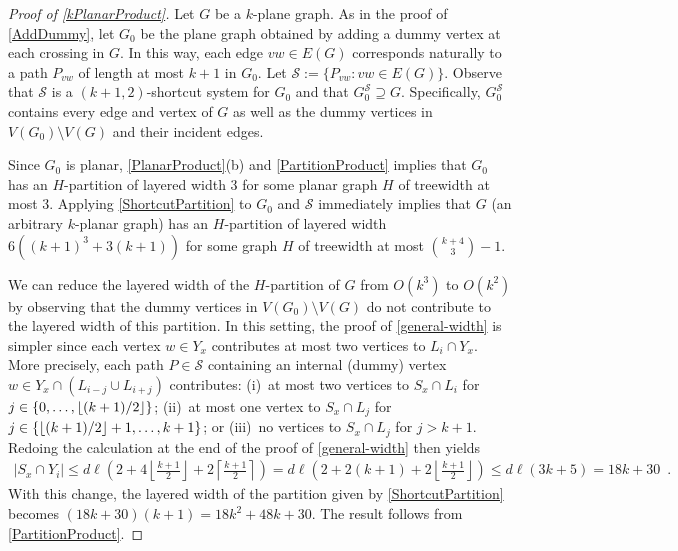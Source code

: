 \documentclass{patmorin}
\theoremstyle{plain}
\newtheorem{thm}{Theorem}
\theoremstyle{definition}
\DeclareMathOperator{\tw}{tw}
\DeclarePairedDelimiter{\floor}{\lfloor}{\rfloor}
\renewcommand{\SS}{\mathcal{S}}
\renewcommand{\le}{\leqslant}
\renewcommand{\leq}{\leqslant}
\newcommand{\R}{\mathbb{R}}
\begin{document}

\begin{proof}[Proof of \cref{kPlanarProduct}]
	Let $G$ be a $k$-plane graph.
	As in the proof of \cref{AddDummy}, let $G_0$ be the plane graph obtained by adding a dummy vertex at each crossing in $G$. In this way, each edge $vw\in E(G)$ corresponds naturally to a path $P_{vw}$ of length at most $k+1$ in $G_0$.  Let $\SS := \{P_{vw}: vw\in E(G)\}$. Observe that $\SS$ is a $(k+1,2)$-shortcut system for $G_0$ and that $G_0^{\SS}\supseteq G$.  Specifically, $G_0^{\SS}$ contains every edge and vertex of $G$ as well as the dummy vertices in $V(G_0)\setminus V(G)$ and their incident edges.

	Since $G_0$ is planar,  \cref{PlanarProduct}(b) and \cref{PartitionProduct} implies that $G_0$ has an $H$-partition of layered width 3 for some planar graph $H$ of treewidth at most 3.  Applying \cref{ShortcutPartition} to $G_0$ and $\SS$ immediately implies that $G$ (an arbitrary $k$-planar graph) has an $H$-partition of layered width $6((k+1)^3+3(k+1))$ for some graph $H$ of treewidth at most $\binom{k+4}{3}-1$.

	We can reduce the layered width of the $H$-partition of $G$ from $O(k^3)$ to $O(k^2)$ by observing that the dummy vertices in $V(G_0)\setminus V(G)$ do not contribute to the layered width of this partition.  In this setting, the proof of \cref{general-width} is simpler since each vertex $w\in Y_x$ contributes at most two vertices to $L_i\cap Y_x$.  More precisely, each path $P\in\SS$ containing an internal (dummy) vertex $w\in Y_x\cap (L_{i-j}\cup L_{i+j})$ contributes: (i)~at most two vertices to $S_x\cap L_i$ for $j\in\{0,\ldots,\floor{(k+1)/2}\}$; (ii)~at most one vertex to $S_x\cap L_j$ for $j\in\{\floor{(k+1)/2}+1,\ldots,k+1\}$; or (iii)~no vertices to $S_x\cap L_j$ for $j > k+1$.
	Redoing the calculation at the end of the proof of \cref{general-width} then yields
	\begin{align*}
	|S_x\cap Y_i| \le d\ell\left(
	2
	+ 4\left\lfloor\tfrac{k+1}{2}\right\rfloor
	+ 2\left\lceil\tfrac{k+1}{2}\right\rceil
	\right)
	 =
	d\ell\left(
	2 + 2(k+1) + 2\left\lfloor\tfrac{k+1}{2}\right\rfloor
	\right)
	 \le
	d\ell(3k+5)
	= 18k+30 \enspace .
	\end{align*}
	With this change, the layered width of the partition given by \cref{ShortcutPartition} becomes $(18k+30)(k+1)=18k^2+48k+30$.
	The result follows from \cref{PartitionProduct}.
\end{proof}
\end{document}
